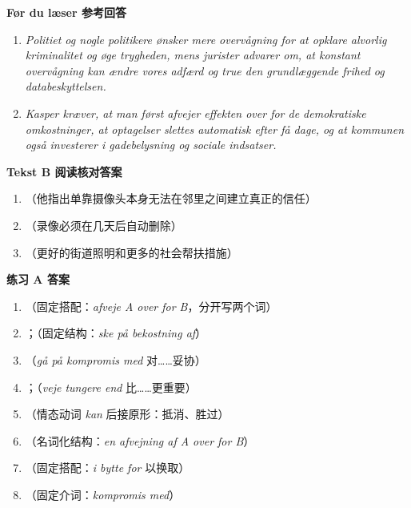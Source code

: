 \begin{answerbox}
\textbf{Før du læser 参考回答}
\begin{enumerate}
  \item \textit{Politiet og nogle politikere ønsker mere overvågning for at opklare alvorlig kriminalitet og øge trygheden, mens jurister advarer om, at konstant overvågning kan ændre vores adfærd og true den grundlæggende frihed og databeskyttelsen.}
  \item \textit{Kasper kræver, at man først afvejer effekten over for de demokratiske omkostninger, at optagelser slettes automatisk efter få dage, og at kommunen også investerer i gadebelysning og sociale indsatser.}
\end{enumerate}

\textbf{Tekst B 阅读核对答案}
\begin{enumerate}
  \item {}（他指出单靠摄像头本身无法在邻里之间建立真正的信任）
  \item {}（录像必须在几天后自动删除）
  \item {}（更好的街道照明和更多的社会帮扶措施）
\end{enumerate}

\textbf{练习 A 答案}
\begin{enumerate}
  \item {}（固定搭配：\textit{afveje A over for B}，分开写两个词）
  \item {}；（固定结构：\textit{ske på bekostning af}）
  \item {}（\textit{gå på kompromis med} 对……妥协）
  \item {}；（\textit{veje tungere end} 比……更重要）
  \item {}（情态动词 \textit{kan} 后接原形：抵消、胜过）
  \item {}（名词化结构：\textit{en afvejning af A over for B}）
  \item {}（固定搭配：\textit{i bytte for} 以换取）
  \item {}（固定介词：\textit{kompromis med}）
\end{enumerate}


\end{answerbox}

